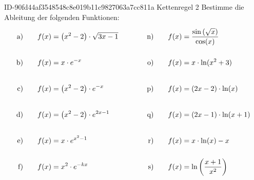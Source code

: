 \begin{exercise}
      {ID-90fd44af3548548c8e019b11c9827063a7cc811a}
      {Kettenregel 2}
  \ifproblem\problem
    Bestimme die Ableitung der folgenden Funktionen:
    \begingroup
      \newcommand{\vstrut}{\rule[-3.5ex]{0pt}{7.5ex}}%
      \newcommand{\xca}{f(x)&=\left(x^{2}-2\right)\cdot\sqrt{3x-1}}%
      \newcommand{\xcb}{f(x)&=x\cdot e^{-x}}%
      \newcommand{\xcc}{f(x)&=\left(x^{2}-2\right)\cdot e^{-x}}%
      \newcommand{\xcd}{f(x)&=\left(x^{2}-2\right)\cdot e^{2x-1}}%
      \newcommand{\xce}{f(x)&=x\cdot e^{x^{2}-1}}%
      \newcommand{\xcf}{f(x)&=x^{2}\cdot e^{-kx}}%
      \newcommand{\xcg}{f(x)&=\frac{4e^{x}}{\left(e^{x}+1\right)^{2}}}%
      \newcommand{\xch}{f(x)&=\left(2x^{2}+3\right)\cdot3^{x}}%
      \newcommand{\xci}{f(x)&=x^{x}}%
      \newcommand{\xcj}{f(x)&=\left(x^{2}+x^{3}\right)^{\sqrt{x}}}%
      \newcommand{\xck}{f(x)&=x+\sin(1-kx)}%
      \newcommand{\xcl}{f(x)&=ax^{2}\cdot\cos(kx)}%
      \newcommand{\xcm}{f(x)&=\tan^{4}(x)}%
      \newcommand{\xcn}{f(x)&=\frac{\sin\left(\sqrt{x}\right)}{\cos(x)}}%
      \newcommand{\xco}{f(x)&=x\cdot\ln(x^{2}+3)}%
      \newcommand{\xcp}{f(x)&=(2x-2)\cdot\ln(x)}%
      \newcommand{\xcq}{f(x)&=(2x-1)\cdot\ln(x+1)}%
      \newcommand{\xcr}{f(x)&=x\cdot\ln(x)-x}%
      \newcommand{\xcs}{f(x)&=\ln\left(\frac{x+1}{x^{2}}\right)}%
      \newcommand{\xct}{f(x)&=\frac{1}{2}\cdot(x-\ln(x))}%
      \newcommand{\xcu}{f(x)&=\frac{1+\ln(x)}{x}}%
      \newcommand{\xcv}{f(x)&=\ln\left(\frac{x+1}{1-x}\right)}%
      \newcommand{\xcw}{f(x)&=\sqrt{\ln(x)}\cdot\ln\left(\frac{1}{x}\right)}%
      \newcommand{\xcx}{f(x)&=\log_{3}(3x+1)}%
      \newcommand{\xcy}{f(x)&=\log_{2}\left(\sin\left(2\pi x\right)\cdot\cos\left(x^{2}\right)\right)}%
      \newcommand{\xcz}{f(x)&=\sin\left(\cos\left(\ln\left(\sqrt{e^{x+2}}\right)\right)\right)}%
      \allowdisplaybreaks
      \begin{alignat*}{5}
        \text{a)\vstrut}&\quad & \xca & \quad&\quad & \text{n)\vstrut}&\quad & \xcn \\
        \text{b)\vstrut}&\quad & \xcb & \quad&\quad & \text{o)\vstrut}&\quad & \xco \\
        \text{c)\vstrut}&\quad & \xcc & \quad&\quad & \text{p)\vstrut}&\quad & \xcp \\
        \text{d)\vstrut}&\quad & \xcd & \quad&\quad & \text{q)\vstrut}&\quad & \xcq \\
        \text{e)\vstrut}&\quad & \xce & \quad&\quad & \text{r)\vstrut}&\quad & \xcr \\
        \text{f)\vstrut}&\quad & \xcf & \quad&\quad & \text{s)\vstrut}&\quad & \xcs \\

\end{alignat*}
\end{exercise}
